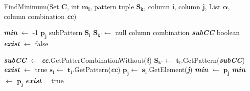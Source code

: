 \begin{algorithm}
	\caption{FindMinimum(Set \textbf{C}, int $\pmb{m_{i}}$, pattern tuple  $\pmb{S_{k}}$, column \textbf{i}, column \textbf{j}, List $\pmb{\alpha}$, column combination \textbf{\textit{cc}})}\label{FindMinimum}
	\begin{algorithmic}[1]
	\State \textbf{\textit{min}} $\gets$ -1
	\State $\pmb{p_{j}}$
	\State subPattern $\pmb{S_{l}}$
	\State $\pmb{S_{k'}} \gets$ null
	\State column combination \textbf{\textit{subCC}}
	\State boolean \textbf{\textit{exist }} $\gets$ false
	
	\State \textbf{\textit{subCC}} $\gets$ \textbf{\textit{cc}}.GetPatterCombinationWithout(\textbf{\textit{i}})
	\State  $\pmb{S_{k'}} \gets$ $\pmb{t_{l}}$.GetPattern(\textbf{\textit{subCC}})
			\State \textbf{\textit{exist }} $\gets$ true
		\EndIf
				\State $\pmb{s_{l}} \gets$ $\pmb{t_{l}}$.GetPattern(\textbf{\textit{cc}})
				\State $\pmb{p_{j}} \gets$ $\pmb{s_{l}}$.GetElement(\textbf{\textit{j}})
					\State \textbf{\textit{min}} $\gets$ $\pmb{p_{j}}$
						\State \textbf{\textit{min}} $\gets$ $\pmb{p_{j}}$
					\EndIf
					\State	\textbf{\textit{exist}} = true
 				\EndIf
			\EndFor
	\end{algorithmic}
\end{algorithm}


